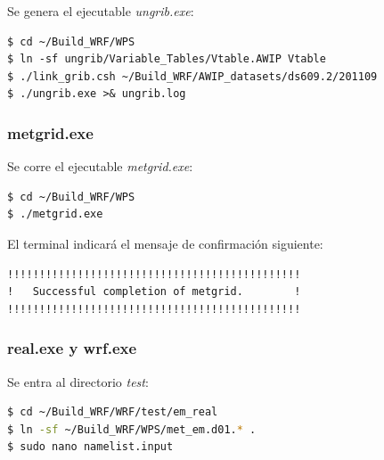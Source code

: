 \documentclass[12pt,letter]{article}
\begin{document}
\noindent Se genera el ejecutable \textit{ungrib.exe}:
\begin{lstlisting}
$ cd ~/Build_WRF/WPS
$ ln -sf ungrib/Variable_Tables/Vtable.AWIP Vtable
$ ./link_grib.csh ~/Build_WRF/AWIP_datasets/ds609.2/201109
$ ./ungrib.exe >& ungrib.log

\end{lstlisting}

\subsubsection*{metgrid.exe}
Se corre el ejecutable \textit{metgrid.exe}:

\begin{lstlisting}
$ cd ~/Build_WRF/WPS
$ ./metgrid.exe
\end{lstlisting}

\noindent El terminal indicar\'a el mensaje de confirmaci\'on siguiente:
\begin{lstlisting}
!!!!!!!!!!!!!!!!!!!!!!!!!!!!!!!!!!!!!!!!!!!!!!
!   Successful completion of metgrid.        !
!!!!!!!!!!!!!!!!!!!!!!!!!!!!!!!!!!!!!!!!!!!!!!
\end{lstlisting}

\subsubsection*{real.exe y wrf.exe}
Se entra al directorio \textit{test}:
\begin{lstlisting}[language=bash]
$ cd ~/Build_WRF/WRF/test/em_real
$ ln -sf ~/Build_WRF/WPS/met_em.d01.* .
$ sudo nano namelist.input
\end{lstlisting}
\end{document}
